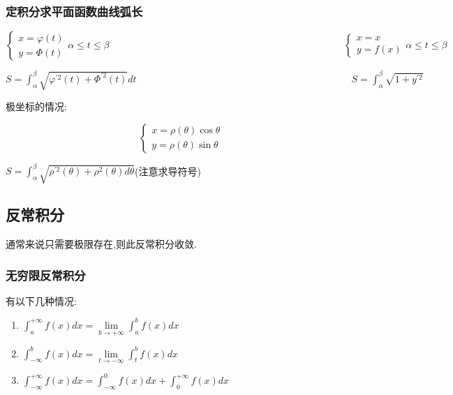 \documentclass[UTF8,12pt]{ctexbook}
\newcommand{\limNormal}[1]{\lim\limits_{#1}}
\newcommand{\defFunction}[1]{f(#1)}
\newcommand{\definiteIntegral}[2]{\int^{#1}_{#2}}
\begin{document}
{{{{}%

\subsubsection{定积分求平面函数曲线弧长}{

  $$
    \begin{cases}
      x = \varphi(t) \\
      y = \Phi(t)
    \end{cases}
    \alpha \leq t \leq \beta
    \qquad\qquad\qquad\qquad\qquad\qquad\qquad\qquad\qquad\qquad\qquad\qquad
    \begin{cases}
      x = x \\
      y = \defFunction{x}
    \end{cases}
    \alpha \leq t \leq \beta
  $$

  $S = \definiteIntegral{\beta}{\alpha}\sqrt{\varphi^{\prime 2}(t) + \Phi^{\prime 2}(t)}dt\qquad\qquad\qquad\qquad\qquad\qquad\qquad\qquad\qquad\qquad\qquad S = \definiteIntegral{\beta}{\alpha}\sqrt{1 + y^{\prime 2}}$

  极坐标的情况:

  $$
    \begin{cases}
      x = \rho(\theta)\cos\theta \\
      y = \rho(\theta)\sin\theta
    \end{cases}
  $$

  $S = \definiteIntegral{\beta}{\alpha}\sqrt{\rho^{\prime 2}(\theta) + \rho^2(\theta)d\theta}$\qquad(注意求导符号)
}%

}%

\subsection{反常积分}{
通常来说只需要极限存在,则此反常积分收敛.

\subsubsection{无穷限反常积分}{

  有以下几种情况:

  \begin{enumerate}
    \item $\definiteIntegral{+\infty}{a}\defFunction{x}dx = \limNormal{b \to +\infty}\definiteIntegral{b}{a}\defFunction{x}dx$
    \item $\definiteIntegral{b}{-\infty}\defFunction{x}dx = \limNormal{t \to -\infty}\definiteIntegral{b}{t}\defFunction{x}dx$
    \item $\definiteIntegral{+\infty}{-\infty}\defFunction{x}dx = \definiteIntegral{0}{-\infty}\defFunction{x}dx + \definiteIntegral{+\infty}{0}\defFunction{x}dx$
  \end{enumerate}
}%


}}}
\end{document}
